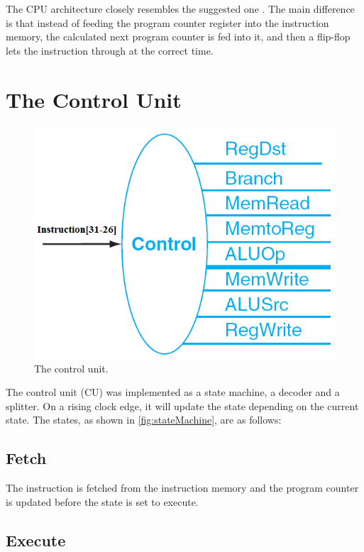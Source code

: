 The CPU architecture closely resembles the suggested one \cite[p.115]{lab-compendium}.
The main difference is that instead of feeding the program counter register into the instruction memory, 
the calculated next program counter is fed into it, and then a flip-flop lets the instruction through at the correct time.

\section{The Control Unit}
\begin{figure}[ht]
    \centering
    \includegraphics[scale=0.3]{figures/controlunit.png}
    \caption{\label{fig:controlUnit}The control unit.}
\end{figure}

The control unit (CU) was implemented as a state machine, a decoder and a
splitter. On a rising clock edge, it will update the state depending on the
current state. The states, as shown in \ref{fig:stateMachine}, are as follows:

\subsection{Fetch}

The instruction is fetched from the instruction memory and the program counter
is updated before the state is set to execute.

\subsection{Execute}

